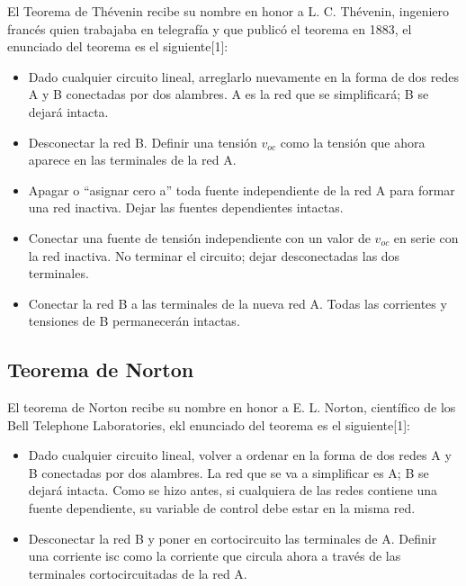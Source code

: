 \documentclass[DIV=calc, paper=a4, fontsize=11pt]{scrartcl}
\begin{document}
\begin{multicols}{2}
El Teorema de Thévenin recibe su nombre en honor a L. C. Thévenin, ingeniero francés quien trabajaba en telegrafía y que publicó el teorema en 1883, el enunciado del teorema es el siguiente[1]:

\begin{itemize}
    \item Dado cualquier circuito lineal, arreglarlo nuevamente en la forma de dos
redes A y B conectadas por dos alambres. A es la red que se simplificará; B
se dejará intacta.

\item Desconectar la red B. Definir una tensión $v_{oc}$ como la tensión que ahora
aparece en las terminales de la red A.

\item Apagar o “asignar cero a” toda fuente independiente de la red A para
formar una red inactiva. Dejar las fuentes dependientes intactas.

\item Conectar una fuente de tensión independiente con un valor de $v_{oc}$ en
serie con la red inactiva. No terminar el circuito; dejar desconectadas las
dos terminales.

\item  Conectar la red B a las terminales de la nueva red A. Todas las corrientes
y tensiones de B permanecerán intactas.
\end{itemize} 




\subsection*{Teorema de Norton}

El teorema de Norton recibe su nombre en honor a E. L. Norton, científico de los Bell Telephone Laboratories, ekl enunciado del teorema es el siguiente[1]:

\begin{itemize}
    \item Dado cualquier circuito lineal, volver a ordenar en la forma de dos
redes A y B conectadas por dos alambres. La red que se va a simplificar
es A; B se dejará intacta. Como se hizo antes, si cualquiera de las redes
contiene una fuente dependiente, su variable de control debe estar en la
misma red.

\item Desconectar la red B y poner en cortocircuito las terminales de A. Definir una corriente isc como la corriente que circula ahora a través de las terminales cortocircuitadas de la red A.


\end{itemize}
\end{multicols}
\end{document}

